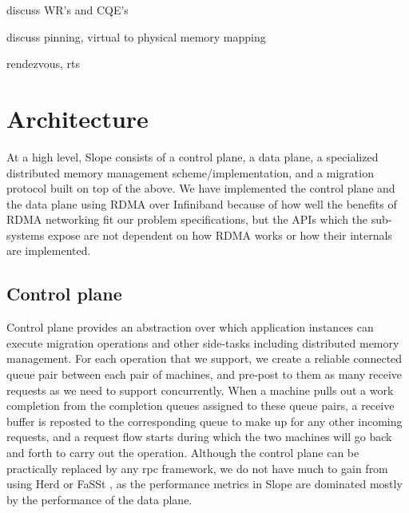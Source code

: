 discuss WR's and CQE's

discuss pinning, virtual to physical memory mapping

rendezvous, rts


\section{Architecture}
At a high level, Slope consists of  a control plane, a data plane,
a specialized distributed memory management
scheme/implementation, and a migration protocol
built on top
of the above. We have implemented the control plane and the data plane using
RDMA over Infiniband because of how well the benefits of RDMA networking
fit our problem specifications, but the APIs which the 
sub-systems expose are not dependent on how RDMA works or how their internals
are implemented.



\subsection{Control plane}
Control plane provides an abstraction over which application instances can
execute migration operations and other side-tasks including distributed
memory management. For each operation that we support, we create a reliable
connected queue pair between each pair of machines, and pre-post to them
as many receive requests as we need to support concurrently. When a
machine pulls out a work completion from the completion queues assigned to
these queue pairs, a receive buffer is reposted to the corresponding queue to
make up for any other incoming requests, and a request flow starts during which
the two machines will go back and forth to carry out the operation. Although
the control plane can be practically replaced by any rpc framework, we do not
have much to gain from using Herd \cite{kalia2016designguidelines} or
FaSSt \cite{kalia2016fasst}, as the performance metrics in Slope are dominated mostly
by the performance of the data plane.


